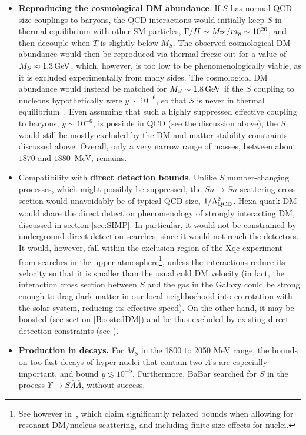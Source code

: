 \begin{itemize}
\item[$\blacktriangleright$] {\bf Reproducing the cosmological DM abundance}.
If $S$ has normal QCD-size couplings to baryons, the QCD interactions would initially keep $S$ in thermal equilibrium with other SM particles, $\Gamma/H \sim M_{\rm Pl}/m_p \sim 10^{20}$, and then decouple
when $T$ is slightly below $M_S$.
The observed cosmological DM abundance would then be reproduced via thermal freeze-out for a value of $M_S \approx 1.3\,{\rm GeV}$, which, however, is too low to be phenomenologically viable, as it is excluded experimentally from many sides.
The cosmological DM abundance would instead be matched for $M_S \sim 1.8 \,{\rm GeV}$ 
if the $S$ coupling to nucleons hypothetically were $y \sim 10^{-6}$,  so that $S$ is never in thermal equilibrium~\cite{6q}. Even assuming that such a highly suppressed effective coupling to baryons, $y\sim 10^{-6}$, is possible in QCD (see the discussion above), the $S$ would still be mostly excluded by the DM and matter stability constraints discussed above. Overall, only a very narrow range of masses, between about $1870$ and $1880$\, MeV, remains.



\item[$\blacktriangleright$] Compatibility with {\bf direct detection bounds}.
Unlike $S$ number-changing processes, which might possibly be suppressed, the $Sn\to Sn$ scattering cross section
would unavoidably be of typical QCD size, $1/\Lambda_{\rm QCD}^2$.
Hexa-quark DM would share the direct detection phenomenology of 
strongly interacting DM, discussed in section \ref{sec:SIMP}.
In particular, it would not be constrained by underground direct detection searches, 
since it would not reach the detectors. 
It would, however, fall within the exclusion region of the {\sc Xqc} experiment from searches in the upper atmosphere\footnote{
See however  in~\cite{6q}, which claim significantly relaxed bounds when allowing for resonant DM/nucleus scattering, and including finite size effects for nuclei. 
}, unless the interactions reduce its velocity so that it is smaller than the usual cold DM velocity (in fact, the interaction cross section between $S$ and the gas in the Galaxy could be strong enough to drag dark matter in our local neighborhood into co-rotation with the solar system, reducing its effective speed). On the other hand, it may be boosted (see section \ref{BoostedDM}) and be thus excluded by existing direct detection constraints (see  \cite{CR:DM:CR}). 





\item[$\blacktriangleright$]
{\bf Production in decays.} For $M_S$ in the 1800 to 2050 MeV range,  the bounds on too fast decays of hyper-nuclei that contain two $\Lambda$'s are especially important, 
and bound $y \lesssim 10^{-5}$.  
Furthermore, {\sc BaBar} searched for $S$ in the process $\Upsilon \to S \bar \Lambda \bar \Lambda$, without success.
\end{itemize}

